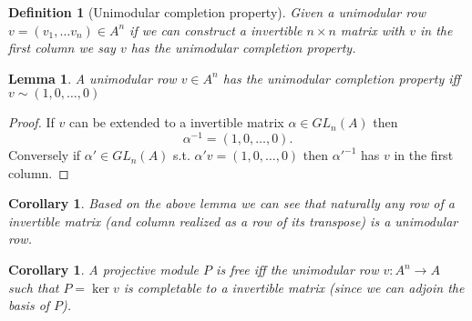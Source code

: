 \documentclass[12pt]{article}
\numberwithin{equation}{section}
\newcounter{dummy} \numberwithin{dummy}{section}
\newtheorem{definition}[dummy]{Definition}
\newtheorem{corollary}[dummy]{Corollary}
\newtheorem{lemma}[dummy]{Lemma}
\begin{document}
	\begin{definition}[Unimodular completion property]
		Given a unimodular row $v=(v_1,\dots v_n) \in A^n$ if we can construct a invertible $n \times n $  matrix with $v$ in the first column we say $v$ has the unimodular completion property.
	\end{definition}
	

	
	\begin{lemma}
		A unimodular row $v \in A^n$ has the unimodular completion property iff $v \sim (1,0,\dots ,0)$
	\end{lemma}
	\begin{proof}
		If $v$ can be extended to a invertible matrix $\alpha \in GL_n(A)$ then \[ \alpha^{-1} = (1,0,\dots, 0). \]
		Conversely if $\alpha' \in GL_n(A) $ s.t. $\alpha'v=(1,0,\dots,0)$ then $\alpha'^{-1}$ has $v$ in the first column.
	\end{proof}
		\begin{corollary}\label{row-of-inv-mat-unimod}
		Based on the above lemma we can see that naturally any row of a invertible matrix (and column realized as a row of its transpose) is a unimodular row. 
	\end{corollary}
	\begin{corollary}
		A projective module $P$ is free iff the unimodular row $v: A^n \to A$ such that $P=\ker v$ is completable to a invertible matrix (since we can adjoin the basis of $P$).
	\end{corollary}
	
\end{document}
